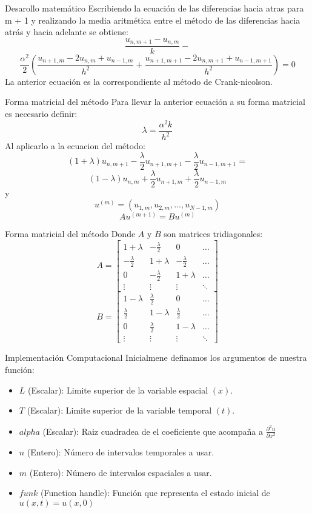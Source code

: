\documentclass{beamer}
\begin{document}
\begin{frame}{Desarollo matemático}
Escribiendo la ecuación de las diferencias hacia atras para m + 1 y realizando la media aritmética entre el método de las diferencias hacia atrás y hacia adelante se obtiene: 
$$\frac{u_{n,m+1}-u_{n,m}}{k}-$$
$$\frac{\alpha^2}{2}(\frac{u_{n+1,m}-2u_{n,m}+u_{n-1,m}}{h^2}+\frac{u_{n+1,m+1}-2u_{n,m+1}+u_{n-1,m+1}}{h^2})=0$$
La anterior ecuación es la correspondiente al método de Crank-nicolson.
\end{frame}
\begin{frame}{Forma matricial del método}
Para llevar la anterior ecuación a su forma matricial es necesario definir:
$$\lambda=\dfrac{\alpha^{2}k}{h^{2}}$$
Al aplicarlo a la ecuacion del método:
$$(1+\lambda)u_{n,m+1}-\frac{\lambda}{2}u_{n+1,m+1}-\frac{\lambda}{2}u_{n-1,m+1}=$$
$$(1-\lambda)u_{n,m}+\frac{\lambda}{2}u_{n+1,m}+\frac{\lambda}{2}u_{n-1,m}$$
y
$$u^{(m)}=(u_{1,m},u_{2,m},\ldots,u_{N-1,m})$$
$$Au^{(m+1)}=Bu^{(m)}$$
\end{frame}
\begin{frame}{Forma matricial del método}
Donde $A$ y $B$ son matrices tridiagonales:
$$
A=
\begin{bmatrix}
  1+\lambda  & -\frac{\lambda}{2} & 0 & \ldots\\ 
 -\frac{\lambda}{2} & 1+\lambda & -\frac{\lambda}{2} & \ldots\\ 
 0 & -\frac{\lambda}{2} & 1+\lambda & \ldots\\ 
 \vdots & \vdots & \vdots & \ddots 
\end{bmatrix}
$$
$$
B=
\begin{bmatrix}
 1-\lambda  & \frac{\lambda}{2} & 0 & \ldots\\ 
 \frac{\lambda}{2} & 1-\lambda & \frac{\lambda}{2} & \ldots\\ 
 0 & \frac{\lambda}{2} & 1-\lambda & \ldots\\ 
 \vdots & \vdots & \vdots & \ddots 
\end{bmatrix}
$$
\end{frame}
\begin{frame}{Implementación Computacional}
Inicialmene definamos los argumentos de nuestra función:
\begin{itemize}
	\item $L$ (Escalar): Limite superior de la variable espacial $(x)$.
	\item $T$ (Escalar): Limite superior de la variable temporal $(t)$.
	\item $alpha$ (Escalar): Raiz cuadradea de el coeficiente que acompaña a $\frac{\partial^2 u}{\partial x^2}$
	\item $n$ (Entero): Número de intervalos temporales a usar.
	\item $m$ (Entero): Número de intervalos espaciales a usar.
	\item $funk$ (Function handle): Función que representa el estado inicial de $u(x,t)=u(x,0)$ 
\end{itemize}
\end{frame}
\end{document}
